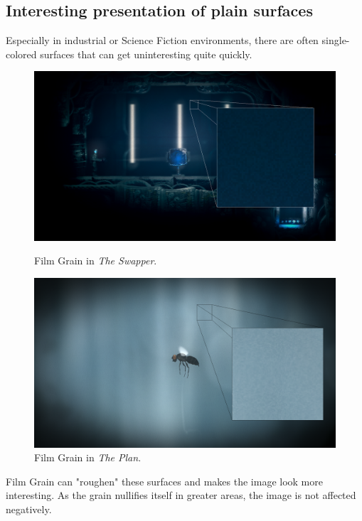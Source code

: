 \documentclass[A4]{article}
\begin{document}
	\subsection{Interesting presentation of plain surfaces}
	Especially in industrial or Science Fiction environments, there are often single-colored surfaces that can get uninteresting quite quickly.
	\begin{figure}
		\begin{center}
			\vspace{-20px}
			\includegraphics[scale=0.09]{TheSwapper.png}
			\vspace{-20px}
		\end{center}
		\caption{Film Grain in \textit{The Swapper}.}
		\begin{center}
			\vspace{-20px}
			\includegraphics[scale=0.09]{ThePlan.png}
			\vspace{-20px}
		\end{center}
		\caption{Film Grain in \textit{The Plan}.}
	\end{figure}
	Film Grain can "roughen" these surfaces and makes the image look more interesting. As the grain nullifies itself in greater areas, the image is not affected negatively.
	
\end{document}
